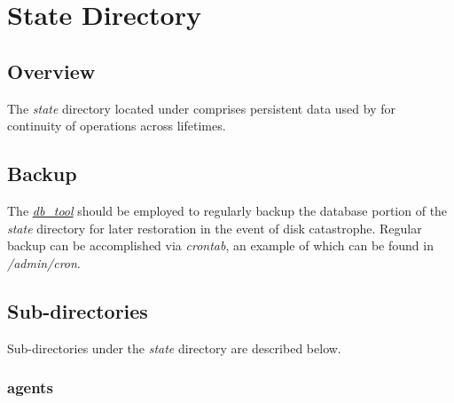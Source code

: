 % 
% 
% 
% 
\ifpdf
\else
{}
\fi
\chapter{State Directory}
\label{chap:state-directory}
    \section{Overview}
    
 	The {\em state} directory located under {\em \duccruntime} comprises 
 	persistent data used by {\DUCC} for continuity of operations across lifetimes.

	\section{Backup}
	\label{sec:state-directory.backup}
	
    The \hyperref[subsec:admin.db-tool]{\em db\_tool}
    should be employed to regularly backup the database portion of the
    {\em state} directory for later restoration in the event of disk
    catastrophe.  
    Regular backup can be accomplished via {\em crontab}, an example of which can
    be found in {\em \duccruntime/admin/cron}.
    
	\section{Sub-directories}
	
	Sub-directories under the {\em state} directory are described below.
	
	\subsection{agents}
	

